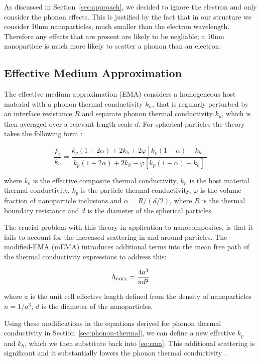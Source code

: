 \documentclass[12pt]{article}
\newcommand{\secref}[2][Section~]{#1\ref{#2}}
\begin{document}
As discussed in \secref{sec:approach}, we decided to ignore the electron and only consider the phonon effects. This is justified by the fact that in our structure we consider 10nm nanoparticles, much smaller than the electron wavelength. Therefore any effects that are present are likely to be negliable; a 10nm nanoparticle is much more likely to scatter a phonon than an electron.

\pagebreak

\subsection{Effective Medium Approximation}
\label{sec:ema}

The effective medium approximation (EMA) considers a homogeneous host material with a phonon thermal conductivity $k_h$, that is regularly perturbed by an interface resistance $R$ and separate phonon thermal conductivity $k_p$, which is then averaged over a relevant length scale $d$. For spherical particles the theory takes the following form \cite{ema}:

\begin{equation}
\label{eq:ema}
	\frac{k_e}{k_h} = \frac{k_p (1 + 2\alpha) + 2k_h + 2	\varphi [k_p (1 - \alpha) - k_h]}{k_p (1 + 2\alpha) + 2k_h -	\varphi [k_p (1 - \alpha) - k_h]}
\end{equation}

where $k_e$ is the effective composite thermal conductivity, $k_h$ is the host material thermal conductivity, $k_p$ is the particle thermal conductivity, $\varphi$  is the volume fraction of nanoparticle inclusions and $\alpha = R / (d / 2)$, where $R$ is the thermal boundary resistance and $d$ is the diameter of the spherical particles.

The crucial problem with this theory in application to nanocomposites, is that it fails to account for the increased scattering in and around particles. The modified-EMA (mEMA) \cite{mema} introduces additional terms into the mean free path of the thermal conductivity expressions to address this:

\begin{equation}
\label{eq:mema}
	\Lambda_{\textsc{coll}} = \frac {4a^3}{\pi d^2}
\end{equation}

where $a$ is the unit cell effective length defined from the density of nanoparticles $n = 1 / a^3$, $d$ is the diameter of the nanoparticles.

Using these modifications in the equations derived for phonon thermal conductivity in \secref{sec:phonon-thermal}, we can define a new effective $k_p$ and $k_h$, which we then substitute back into \eqref{eq:ema}. This additional scattering is significant and it substantially lowers the phonon thermal conductivity \cite{mema}.
\end{document}
